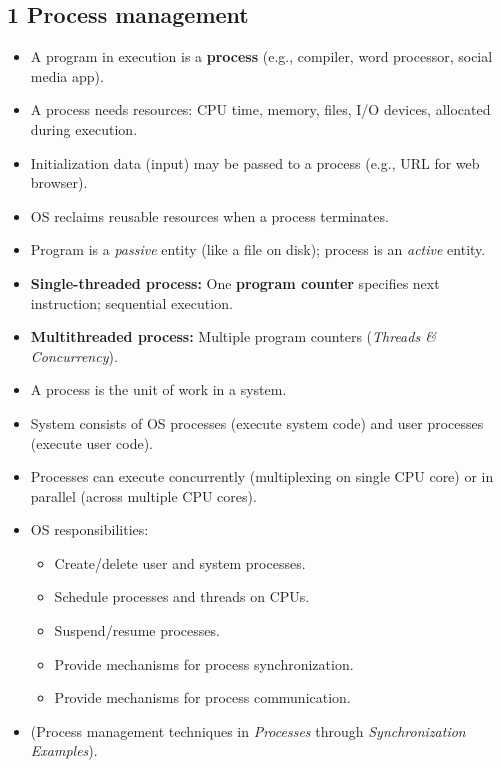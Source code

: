 \documentclass{article}
\begin{document}
\subsection*{1 Process management}
\begin{itemize}
    \item A program in execution is a \textbf{process} (e.g., compiler, word processor, social media app).
    \item A process needs resources: CPU time, memory, files, I/O devices, allocated during execution.
    \item Initialization data (input) may be passed to a process (e.g., URL for web browser).
    \item OS reclaims reusable resources when a process terminates.
    \item Program is a \textit{passive} entity (like a file on disk); process is an \textit{active} entity.
    \item \textbf{Single-threaded process:} One \textbf{program counter} specifies next instruction; sequential execution.
    \item \textbf{Multithreaded process:} Multiple program counters (\textit{Threads \& Concurrency}).
    \item A process is the unit of work in a system.
    \item System consists of OS processes (execute system code) and user processes (execute user code).
    \item Processes can execute concurrently (multiplexing on single CPU core) or in parallel (across multiple CPU cores).
    \item OS responsibilities:
    \begin{itemize}
        \item Create/delete user and system processes.
        \item Schedule processes and threads on CPUs.
        \item Suspend/resume processes.
        \item Provide mechanisms for process synchronization.
        \item Provide mechanisms for process communication.
    \end{itemize}
    \item (Process management techniques in \textit{Processes} through \textit{Synchronization Examples}).
\end{itemize}
\end{document}
